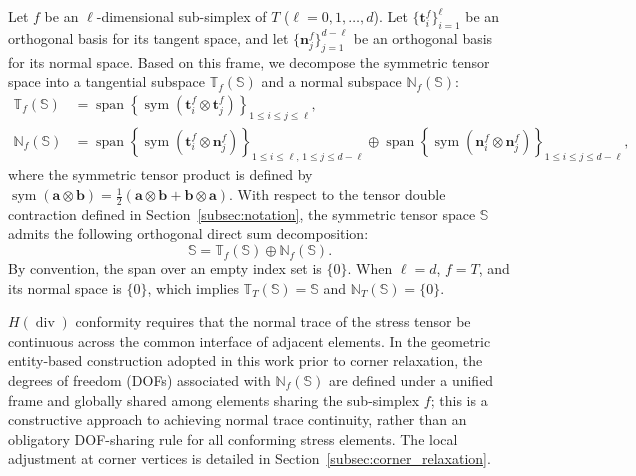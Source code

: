 Let $f$ be an $\ell$-dimensional sub-simplex of $T$ ($\ell = 0, 1, \dots, d$). Let $\{\boldsymbol{t}_i^f\}_{i=1}^{\ell}$ be an orthogonal basis for its tangent space, and let $\{\boldsymbol{n}_j^f\}_{j=1}^{d-\ell}$ be an orthogonal basis for its normal space. Based on this frame, we decompose the symmetric tensor space into a tangential subspace $\mathbb{T}_f(\mathbb{S})$ and a normal subspace $\mathbb{N}_f(\mathbb{S})$:
\begin{equation}
\label{eq:decomp_tangential_normal}
\begin{aligned}
\mathbb{T}_f(\mathbb{S}) &= \operatorname{span} \left\{ \operatorname{sym}(\boldsymbol{t}_i^f \otimes \boldsymbol{t}_j^f) \right\}_{1 \le i \le j \le \ell}, \\
\mathbb{N}_f(\mathbb{S}) &= \operatorname{span} \left\{ \operatorname{sym}(\boldsymbol{t}_i^f \otimes \boldsymbol{n}_j^f) \right\}_{1 \le i \le \ell,\, 1 \le j \le d-\ell}
\oplus \operatorname{span} \left\{ \operatorname{sym}(\boldsymbol{n}_i^f \otimes \boldsymbol{n}_j^f) \right\}_{1 \le i \le j \le d-\ell},
\end{aligned}
\end{equation}
where the symmetric tensor product is defined by $\operatorname{sym}(\boldsymbol{a} \otimes \boldsymbol{b}) = \frac{1}{2}(\boldsymbol{a} \otimes \boldsymbol{b} + \boldsymbol{b} \otimes \boldsymbol{a})$. With respect to the tensor double contraction defined in Section~\ref{subsec:notation}, the symmetric tensor space $\mathbb{S}$ admits the following orthogonal direct sum decomposition:
\[
\mathbb{S} = \mathbb{T}_f(\mathbb{S}) \oplus \mathbb{N}_f(\mathbb{S}).
\]
By convention, the span over an empty index set is $\{0\}$. When $\ell = d$, $f = T$, and its normal space is $\{0\}$, which implies $\mathbb{T}_T(\mathbb{S}) = \mathbb{S}$ and $\mathbb{N}_T(\mathbb{S}) = \{0\}$.

$H(\operatorname{div})$ conformity requires that the normal trace of the stress tensor be continuous across the common interface of adjacent elements. In the geometric entity-based construction adopted in this work prior to corner relaxation, the degrees of freedom (DOFs) associated with $\mathbb{N}_f(\mathbb{S})$ are defined under a unified frame and globally shared among elements sharing the sub-simplex $f$; this is a constructive approach to achieving normal trace continuity, rather than an obligatory DOF-sharing rule for all conforming stress elements. The local adjustment at corner vertices is detailed in Section~\ref{subsec:corner_relaxation}.


